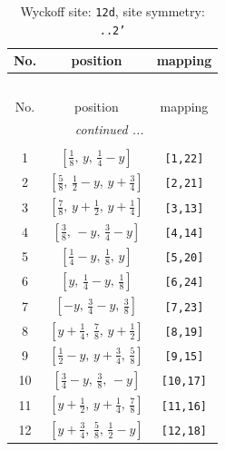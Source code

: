 \documentclass[fleqn,8pt]{jsarticle}
\begin{document}
\begin{longtable}{ccc}
\caption{Wyckoff site: {\tt 12d}, site symmetry: {\tt ..2'}}
 \\
 \hline \hline
No. & position & mapping \\ \hline \endfirsthead

\multicolumn{2}{l}{\tablename\ \thetable{}} \\
 \hline \hline
No. & position & mapping \\ \hline \endhead

 \hline \hline
\multicolumn{2}{r}{\footnotesize\it continued ...} \\ \endfoot

 \hline \hline
\multicolumn{2}{r}{} \\ \endlastfoot

1 & $\left[ \frac{1}{8},\, y,\, \frac{1}{4} - y \right]$ & {\tt [1,22]} \\ \hline
2 & $\left[ \frac{5}{8},\, \frac{1}{2} - y,\, y + \frac{3}{4} \right]$ & {\tt [2,21]} \\ \hline
3 & $\left[ \frac{7}{8},\, y + \frac{1}{2},\, y + \frac{1}{4} \right]$ & {\tt [3,13]} \\ \hline
4 & $\left[ \frac{3}{8},\, - y,\, \frac{3}{4} - y \right]$ & {\tt [4,14]} \\ \hline
5 & $\left[ \frac{1}{4} - y,\, \frac{1}{8},\, y \right]$ & {\tt [5,20]} \\ \hline
6 & $\left[ y,\, \frac{1}{4} - y,\, \frac{1}{8} \right]$ & {\tt [6,24]} \\ \hline
7 & $\left[ - y,\, \frac{3}{4} - y,\, \frac{3}{8} \right]$ & {\tt [7,23]} \\ \hline
8 & $\left[ y + \frac{1}{4},\, \frac{7}{8},\, y + \frac{1}{2} \right]$ & {\tt [8,19]} \\ \hline
9 & $\left[ \frac{1}{2} - y,\, y + \frac{3}{4},\, \frac{5}{8} \right]$ & {\tt [9,15]} \\ \hline
10 & $\left[ \frac{3}{4} - y,\, \frac{3}{8},\, - y \right]$ & {\tt [10,17]} \\ \hline
11 & $\left[ y + \frac{1}{2},\, y + \frac{1}{4},\, \frac{7}{8} \right]$ & {\tt [11,16]} \\ \hline
12 & $\left[ y + \frac{3}{4},\, \frac{5}{8},\, \frac{1}{2} - y \right]$ & {\tt [12,18]} \\
\end{longtable}
\renewcommand{\arraystretch}{1.2}
\end{document}

